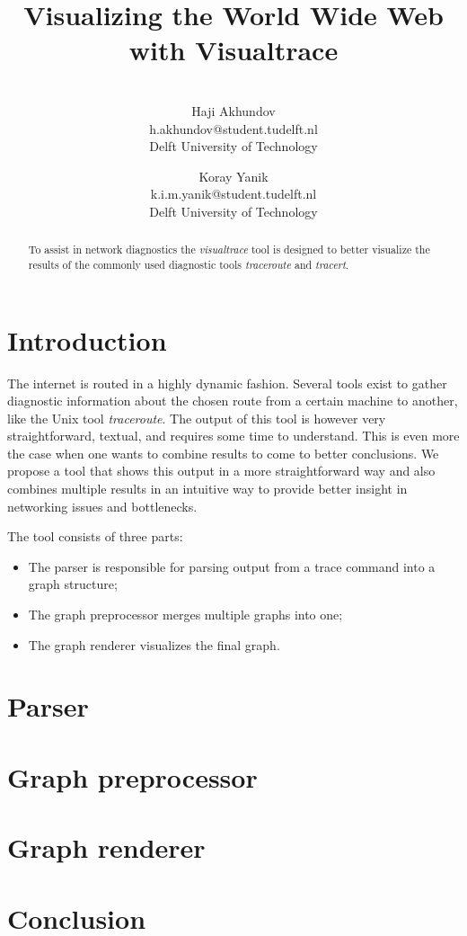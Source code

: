 \documentclass[a4paper,10pt]{article}
\title{Visualizing the World Wide Web with Visualtrace}
\author{\\Haji Akhundov\\h.akhundov@student.tudelft.nl\\ Delft University of Technology \and Koray Yanik\\k.i.m.yanik@student.tudelft.nl\\ Delft University of Technology}
\begin{document}
\maketitle

\begin{abstract}
To assist in network diagnostics the \emph{visualtrace} tool is designed to better visualize the results of the commonly used diagnostic tools \emph{traceroute} and \emph{tracert}.
\end{abstract}

\section{Introduction}
The internet is routed in a highly dynamic fashion. Several tools exist to gather diagnostic information about the chosen route from a certain machine to another, like the Unix tool \emph{traceroute}. The output of this tool is however very straightforward, textual, and requires some time to understand. This is even more the case when one wants to combine results to come to better conclusions. We propose a tool that shows this output in a more straightforward way and also combines multiple results in an intuitive way to provide better insight in networking issues and bottlenecks.

The tool consists of three parts:
\begin{itemize}
\item The parser is responsible for parsing output from a trace command into a graph structure;
\item The graph preprocessor merges multiple graphs into one;
\item The graph renderer visualizes the final graph.
\end{itemize}

\section{Parser}

\section{Graph preprocessor}

\section{Graph renderer}

\section{Conclusion}
\end{document}
